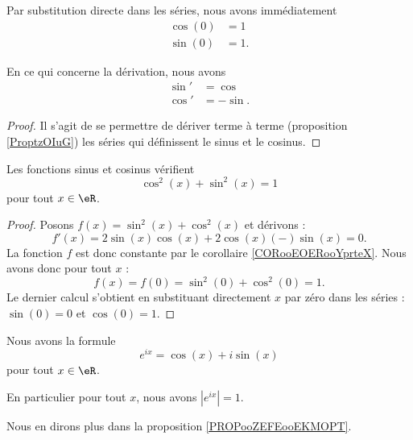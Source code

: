 Par substitution directe dans les séries, nous avons immédiatement
\begin{subequations}        \label{SUBEQooTTNNooXzApSM}
    \begin{align}
        \cos(0)&=1\\
        \sin(0)&=1.
    \end{align}
\end{subequations}

\begin{lemma}       \label{LEMooBBCAooHLWmno}
    En ce qui concerne la dérivation, nous avons
    \begin{subequations}
        \begin{align}
            \sin'&=\cos\\
            \cos'&=-\sin.
        \end{align}
    \end{subequations}
\end{lemma}

\begin{proof}
    Il s'agit de se permettre de dériver terme à terme (proposition \ref{ProptzOIuG}) les séries qui définissent le sinus et le cosinus.
\end{proof}

\begin{lemma}       \label{LEMooAEFPooGSgOkF}
    Les fonctions sinus et cosinus vérifient
    \begin{equation}
        \cos^2(x)+\sin^2(x)=1
    \end{equation}
    pour tout \( x\in \eR\).
\end{lemma}

\begin{proof}
    Posons \( f(x)=\sin^2(x)+\cos^2(x)\) et dérivons :
    \begin{equation}
        f'(x)=2\sin(x)\cos(x)+2\cos(x)(-)\sin(x)=0.
    \end{equation}
    La fonction \( f\) est donc constante par le corollaire \ref{CORooEOERooYprteX}. Nous avons donc pour tout \( x\) :
    \begin{equation}
        f(x)=f(0)=\sin^2(0)+\cos^2(0)=1.
    \end{equation}
    Le dernier calcul s'obtient en substituant directement \( x\) par zéro dans les séries : \( \sin(0)=0\) et \( \cos(0)=1\).
\end{proof}

\begin{lemma}       \label{LEMooHOYZooKQTsXW}
    Nous avons la formule
    \begin{equation}        \label{EQooRVPJooTMwNTU}
        e^{ix}=\cos(x)+i\sin(x)
    \end{equation}
    pour tout \( x\in \eR\).

    En particulier pour tout \( x\), nous avons \( |  e^{ix} |=1\).
\end{lemma}
Nous en dirons plus dans la proposition \ref{PROPooZEFEooEKMOPT}.

